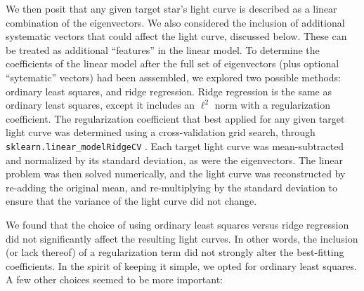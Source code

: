 \documentclass[12pt,twocolumn,tighten]{aastex63}
\begin{document}
We then posit that any given target star's light curve is described as
a linear combination of the eigenvectors.  We also considered the
inclusion of additional systematic vectors that could affect the light
curve, discussed below.  These can be treated as additional
``features'' in the linear model.  To determine the coefficients of
the linear model after the full set of eigenvectors (plus optional
``sytematic'' vectors) had been asssembled,  we explored two possible
methods: ordinary least squares, and ridge regression. Ridge
regression is the same as ordinary least squares, except it includes
an $\ell^2$ norm with a regularization coefficient. The regularization
coefficient that best applied for any given target light curve was
determined using a cross-validation grid search, through
\texttt{sklearn.linear\_modelRidgeCV} \citep{scikit-learn}.  Each
target light curve was mean-subtracted and normalized by its standard
deviation, as were the eigenvectors. The linear problem was then
solved numerically, and the light curve was reconstructed by re-adding
the original mean, and re-multiplying by the standard deviation to
ensure that the variance of the light curve did not change.

We found that the choice of using ordinary least squares versus ridge
regression did not significantly affect the resulting light
curves. In other words, the inclusion (or lack thereof) of a
regularization term did not strongly alter the best-fitting
coefficients.  In the spirit of keeping it simple, we opted for
ordinary least squares.  A few other choices seemed to be more
important:
\end{document}

